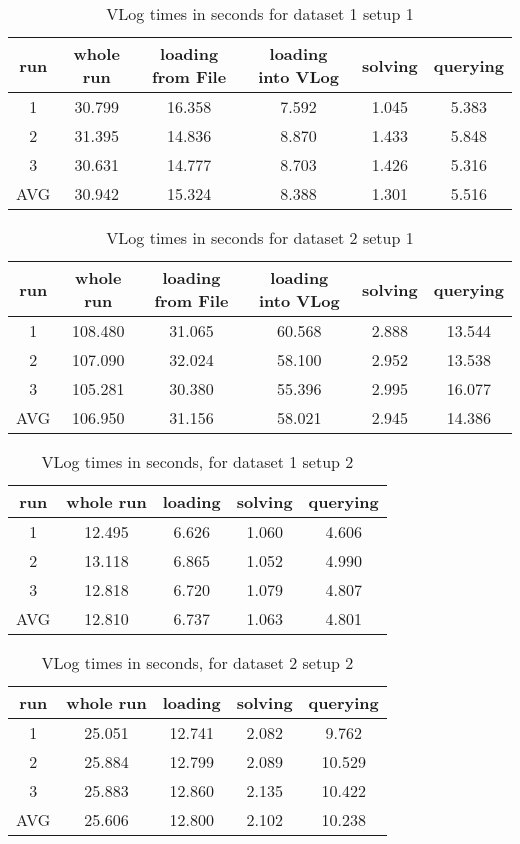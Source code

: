 \documentclass[hyperref, bachelorofscience]{cgvpub}
\begin{document}
\begin{table}
\center
\begin{tabular}{|c|c|c|c|c|c|}
\hline
run & whole run & loading from File & loading into VLog & solving & querying \\
\hline
\hline
1 & 30.799 & 16.358 & 7.592 & 1.045 & 5.383 \\
2 & 31.395 & 14.836 & 8.870 & 1.433 & 5.848 \\
3 & 30.631 & 14.777 & 8.703 & 1.426 & 5.316 \\
AVG  & 30.942 & 15.324 & 8.388 & 1.301 & 5.516 \\
\hline

\end{tabular}
\caption{VLog times in seconds for dataset 1 setup 1}
\end{table}

\begin{table}
\center
\begin{tabular}{|c|c|c|c|c|c|}
\hline
run & whole run & loading from File & loading into VLog & solving & querying \\
\hline
\hline
1 & 108.480 & 31.065 & 60.568 & 2.888 & 13.544 \\
2 & 107.090 & 32.024 & 58.100 & 2.952 & 13.538 \\
3 & 105.281 & 30.380 & 55.396 & 2.995 & 16.077 \\
AVG & 106.950 & 31.156 & 58.021 & 2.945 & 14.386 \\
\hline

\end{tabular}
\caption{VLog times in seconds for dataset 2 setup 1}
\end{table}

\begin{table}
\center
\begin{tabular}{|c|c|c|c|c|}
\hline
run & whole run & loading & solving & querying \\
\hline
\hline
1 & 12.495 & 6.626 & 1.060 & 4.606 \\
2 & 13.118 & 6.865 & 1.052 & 4.990 \\
3 & 12.818 & 6.720 & 1.079 & 4.807 \\
AVG & 12.810 & 6.737 & 1.063 & 4.801 \\
\hline

\end{tabular}
\caption{VLog times in seconds, for dataset 1 setup 2}
\end{table}

\begin{table}
\center
\begin{tabular}{|c|c|c|c|c|}
\hline
run & whole run & loading & solving & querying \\
\hline
\hline
1 & 25.051 & 12.741 & 2.082 & 9.762 \\
2 & 25.884 & 12.799 & 2.089 & 10.529 \\
3 & 25.883 & 12.860 & 2.135 & 10.422 \\
AVG & 25.606 & 12.800 & 2.102 & 10.238 \\
\hline

\end{tabular}
\caption{VLog times in seconds, for dataset 2 setup 2}
\end{table}
\end{document}
